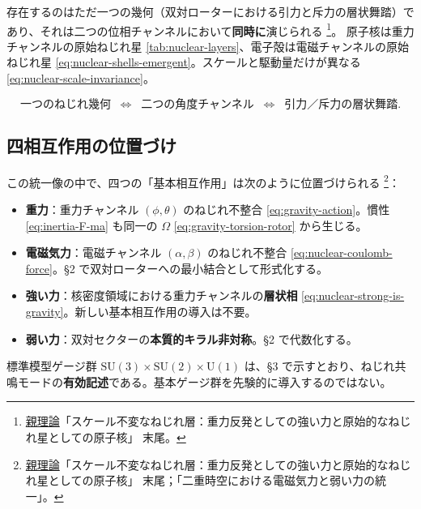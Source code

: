 \documentclass[dvipdfmx,a4paper,oneside]{jsbook}
\numberwithin{equation}{chapter}
\begin{document}
存在するのはただ一つの幾何（双対ローターにおける引力と斥力の層状舞踏）であり、それは二つの位相チャンネルにおいて\textbf{同時に}演じられる \footnote{\hyperref[sec:sister-manuscripts]{親理論}「スケール不変なねじれ層：重力反発としての強い力と原始的なねじれ星としての原子核」 末尾。}。
原子核は重力チャンネルの原始ねじれ星 \eqref{tab:nuclear-layers}、電子殻は電磁チャンネルの原始ねじれ星 \eqref{eq:nuclear-shells-emergent}。スケールと駆動量だけが異なる \eqref{eq:nuclear-scale-invariance}。

\begin{equation}
  \boxed{\;
  \text{一つのねじれ幾何}
  \;\;\Longleftrightarrow\;\;
  \text{二つの角度チャンネル}
  \;\;\Longleftrightarrow\;\;
  \text{引力／斥力の層状舞踏}.
  \;}
  \label{eq:unif-two-channels}
\end{equation}

\subsection{四相互作用の位置づけ}

この統一像の中で、四つの「基本相互作用」は次のように位置づけられる \footnote{\hyperref[sec:sister-manuscripts]{親理論}「スケール不変なねじれ層：重力反発としての強い力と原始的なねじれ星としての原子核」 末尾；「二重時空における電磁気力と弱い力の統一」。}：
\begin{itemize}[leftmargin=2em]
  \item \textbf{重力}：重力チャンネル \((\phi, \theta)\) のねじれ不整合 \eqref{eq:gravity-action}。慣性 \eqref{eq:inertia-F-ma} も同一の \(\Omega\) \eqref{eq:gravity-torsion-rotor} から生じる。
  \item \textbf{電磁気力}：電磁チャンネル \((\alpha, \beta)\) のねじれ不整合 \eqref{eq:nuclear-coulomb-force}。§2 で双対ローターへの最小結合として形式化する。
  \item \textbf{強い力}：核密度領域における重力チャンネルの\textbf{層状相} \eqref{eq:nuclear-strong-is-gravity}。新しい基本相互作用の導入は不要。
  \item \textbf{弱い力}：双対セクターの\textbf{本質的キラル非対称}。§2 で代数化する。
\end{itemize}
標準模型ゲージ群 \(\mathrm{SU}(3)\times\mathrm{SU}(2)\times\mathrm{U}(1)\) は、§3 で示すとおり、ねじれ共鳴モードの\textbf{有効記述}である。基本ゲージ群を先験的に導入するのではない。
\end{document}
